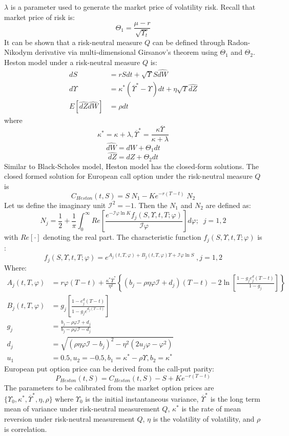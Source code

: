 \documentclass[letterpaper,12pt,titlepage,oneside,final]{book}
\numberwithin{equation}{section}
\theoremstyle{definition}
\begin{document}
$\lambda$ is a parameter used to generate the market price of volatility risk.
Recall that market price of risk is:
\[
\Theta_1=\frac{\mu-r}{\sqrt{\Upsilon_t}}
\]
It can be shown that a risk-neutral measure $Q$ can be defined through Radon-Nikodym derivative via multi-dimensional Girsanov's theorem \cite{shreve2004stochastic} using  $\Theta_1$ and $\Theta_2$. Heston model under a risk-neutral measure $Q$ is:
\begin{equation}
\begin{split}
dS&=r S dt + \sqrt{\Upsilon} S \hat{dW}\\
d\Upsilon&=\kappa^*(\overline{\Upsilon}^*-\Upsilon)dt+\eta \sqrt{\Upsilon}\hat{dZ}\\
E[\hat{dZ}\hat{dW}]&=\rho dt
\end{split}
\label{eq:hestonNeutral}
\end{equation}
where
\[
\kappa^*=\kappa+\lambda, \overline{\Upsilon}^*=\frac{\kappa \overline{\Upsilon}}{\kappa+\lambda}
\]
\[
\hat{dW}=dW+\Theta_1 dt
\]
\[
\hat{dZ}=dZ+\Theta_2 dt
\]
Similar to Black-Scholes model, Heston model has the closed-form solutions. The closed formed solution for European call option under  the risk-neutral measure $Q$ is
\begin{equation}
	\label{eq:hestonPrice}
C_{Heston}(t,S)=S\; N_1-Ke^{-r(T-t)} \; N_2
\end{equation}
Let us define the imaginary unit $\mathcal{I}^2=-1$. Then the $N_1$ and $N_2$ are defined as:
\[
N_j=\frac{1}{2}+\frac{1}{\pi}\int_{0}^{\infty} Re \left[\frac{e^{-\mathcal{I} \varphi \ln{K}} f_j(S,\Upsilon,t,T;\varphi)} {\mathcal{I}\varphi} \right] d\varphi;\;\; j=1,2
\] with $Re[\cdot]$ denoting the real part.
The characteristic function $f_j(S,\Upsilon,t,T;\varphi)$ is :
\[
f_j(S,\Upsilon,t,T;\varphi)=e^{A_j(t,T,\varphi)+B_j(t,T,\varphi)\Upsilon+\mathcal{I} \varphi \ln{S}}\;, j=1,2
\]
Where:
\[
\begin{split}
A_j(t,T,\varphi)&=r \varphi (T-t)+ \frac{\kappa^* \overline{\Upsilon}^*}{\eta^2}\left\{(b_j-\rho \eta \varphi \mathcal{I}+ d_j) (T-t)- 2\ln{\left[ \frac{1-g_je^d_j(T-t)}{1-g_j}\right]}     \right\}\\
B_j(t,T,\varphi)&=g_j\left[ \frac{1-e^d_j(T-t)}{1-g_je^{d_j(T-t)}}\right] \\
g_j&=\frac{b_j-\rho\varphi \mathcal{I}+d_j}{b_j-\rho\varphi \mathcal{I}-d_j}\\
d_j&=\sqrt{(\rho \eta \varphi \mathcal{I}-b_j)^2-\eta^2(2 u_j \varphi- \varphi^2)}\\
u_1&=0.5, u_2=-0.5, b_1=\kappa^*-\rho \Upsilon, b_2=\kappa^*
\end{split}
\]
European put option price can be derived from the call-put parity:
\[
P_{Heston}(t,S)=C_{Heston}(t,S)-S+K e^{-r(T-t)}
\]
The parameters to be calibrated from the market option prices are $\{\Upsilon_0,\kappa^*,\overline{\Upsilon}^*,\eta,\rho\}$ where $\Upsilon_0$ is the initial instantaneous variance, $\overline{\Upsilon}^*$ is the long term mean of variance under risk-neutral measurement $Q$, $\kappa^*$ is the rate of mean reversion under risk-neutral measurement $Q$, $\eta$ is the volatility of volatility, and $\rho$ is correlation.
\end{document}

